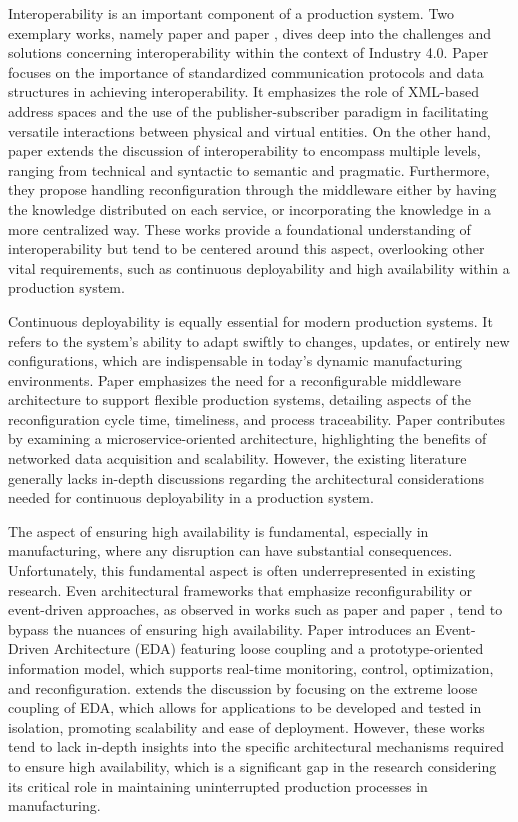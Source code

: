 Interoperability is an important component of a production system. Two exemplary works, namely paper \cite{Ungurean2020-nq} and paper \cite{Jepsen2021-dx}, dives deep into the challenges and solutions concerning interoperability within the context of Industry 4.0. Paper \cite{Ungurean2020-nq} focuses on the importance of standardized communication protocols and data structures in achieving interoperability. It emphasizes the role of XML-based address spaces and the use of the publisher-subscriber paradigm in facilitating versatile interactions between physical and virtual entities. On the other hand, paper \cite{Jepsen2021-dx} extends the discussion of interoperability to encompass multiple levels, ranging from technical and syntactic to semantic and pragmatic. Furthermore, they propose handling reconfiguration through the middleware either by having the knowledge distributed on each service, or incorporating the knowledge in a more centralized way. These works provide a foundational understanding of interoperability but tend to be centered around this aspect, overlooking other vital requirements, such as continuous deployability and high availability within a production system.

Continuous deployability is equally essential for modern production systems. It refers to the system's ability to adapt swiftly to changes, updates, or entirely new configurations, which are indispensable in today's dynamic manufacturing environments. Paper \cite{Jepsen2021-nq} emphasizes the need for a reconfigurable middleware architecture to support flexible production systems, detailing aspects of the reconfiguration cycle time, timeliness, and process traceability. Paper \cite{Alejandro2019-nq} contributes by examining a microservice-oriented architecture, highlighting the benefits of networked data acquisition and scalability. However, the existing literature generally lacks in-depth discussions regarding the architectural considerations needed for continuous deployability in a production system.

The aspect of ensuring high availability is fundamental, especially in manufacturing, where any disruption can have substantial consequences. Unfortunately, this fundamental aspect is often underrepresented in existing research. Even architectural frameworks that emphasize reconfigurability or event-driven approaches, as observed in works such as paper \cite{Jepsen2023-zz} and paper \cite{Theorin2017-nq}, tend to bypass the nuances of ensuring high availability. Paper \cite{Jepsen2023-zz} introduces an Event-Driven Architecture (EDA) featuring loose coupling and a prototype-oriented information model, which supports real-time monitoring, control, optimization, and reconfiguration. \cite{Theorin2017-nq} extends the discussion by focusing on the extreme loose coupling of EDA, which allows for applications to be developed and tested in isolation, promoting scalability and ease of deployment. However, these works tend to lack in-depth insights into the specific architectural mechanisms required to ensure high availability, which is a significant gap in the research considering its critical role in maintaining uninterrupted production processes in manufacturing.

